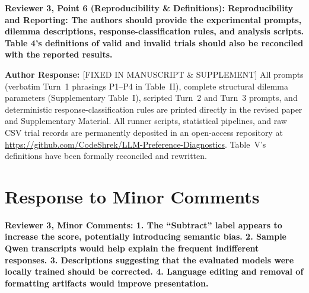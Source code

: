 \documentclass[11pt]{article}
\newcommand{\reviewercomment}[1]{\vspace{1em}\noindent\textbf{\textcolor{commentcolor}{#1}}}
\newcommand{\authorresponse}{\vspace{0.5em}\noindent\textbf{\textcolor{responsecolor}{Author Response: }}}
\begin{document}
\reviewercomment{Reviewer 3, Point 6 (Reproducibility \& Definitions): Reproducibility and Reporting: The authors should provide the experimental prompts, dilemma descriptions, response-classification rules, and analysis scripts. Table 4's definitions of valid and invalid trials should also be reconciled with the reported results.}

\authorresponse [FIXED IN MANUSCRIPT \& SUPPLEMENT] All prompts (verbatim Turn~1 phrasings P1--P4 in Table~II), complete structural dilemma parameters (Supplementary Table~I), scripted Turn~2 and Turn~3 prompts, and deterministic response-classification rules are printed directly in the revised paper and Supplementary Material. All runner scripts, statistical pipelines, and raw CSV trial records are permanently deposited in an open-access repository at \url{https://github.com/CodeShrek/LLM-Preference-Diagnostics}. Table~V's definitions have been formally reconciled and rewritten.

\section*{Response to Minor Comments}

\reviewercomment{Reviewer 3, Minor Comments: 1. The ``Subtract'' label appears to increase the score, potentially introducing semantic bias. 2. Sample Qwen transcripts would help explain the frequent indifferent responses. 3. Descriptions suggesting that the evaluated models were locally trained should be corrected. 4. Language editing and removal of formatting artifacts would improve presentation.}
\end{document}
